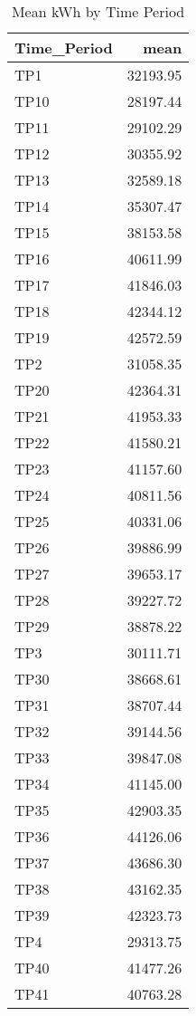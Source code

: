 \documentclass[]{article}
\theoremstyle{definition}
\theoremstyle{definition}
\theoremstyle{definition}
\theoremstyle{remark}
\begin{document}
\begin{table}

\caption{\label{tab:exploreNA}Mean kWh by Time Period}
\centering
\begin{tabular}[t]{l|r}
\hline
Time\_Period & mean\\
\hline
TP1 & 32193.95\\
\hline
TP10 & 28197.44\\
\hline
TP11 & 29102.29\\
\hline
TP12 & 30355.92\\
\hline
TP13 & 32589.18\\
\hline
TP14 & 35307.47\\
\hline
TP15 & 38153.58\\
\hline
TP16 & 40611.99\\
\hline
TP17 & 41846.03\\
\hline
TP18 & 42344.12\\
\hline
TP19 & 42572.59\\
\hline
TP2 & 31058.35\\
\hline
TP20 & 42364.31\\
\hline
TP21 & 41953.33\\
\hline
TP22 & 41580.21\\
\hline
TP23 & 41157.60\\
\hline
TP24 & 40811.56\\
\hline
TP25 & 40331.06\\
\hline
TP26 & 39886.99\\
\hline
TP27 & 39653.17\\
\hline
TP28 & 39227.72\\
\hline
TP29 & 38878.22\\
\hline
TP3 & 30111.71\\
\hline
TP30 & 38668.61\\
\hline
TP31 & 38707.44\\
\hline
TP32 & 39144.56\\
\hline
TP33 & 39847.08\\
\hline
TP34 & 41145.00\\
\hline
TP35 & 42903.35\\
\hline
TP36 & 44126.06\\
\hline
TP37 & 43686.30\\
\hline
TP38 & 43162.35\\
\hline
TP39 & 42323.73\\
\hline
TP4 & 29313.75\\
\hline
TP40 & 41477.26\\
\hline
TP41 & 40763.28\\

\end{tabular}
\end{table}
\end{document}
